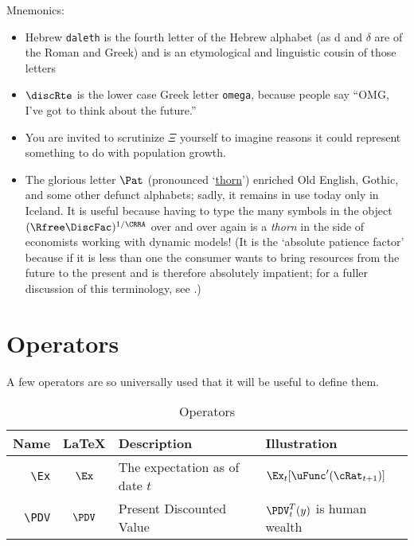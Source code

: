 \documentclass[12pt]{econtex}
\begin{document}
Mnemonics:
\begin{itemize}
\item Hebrew \texttt{daleth} is the fourth letter of the Hebrew alphabet (as d and $\delta$ are of the Roman and Greek) and is an etymological and linguistic cousin of those letters
\item $\discRte$ is the lower case Greek letter \texttt{omega}, because people say ``OMG, I've got to think about the future.''
\item You are invited to scrutinize $\Xi$ yourself to imagine reasons it could represent something to do with population growth.  
\item The glorious letter $\Pat$ (pronounced `\href{http://en.wikipedia.org/wiki/Thorn_(letter)}{thorn}') enriched Old English, Gothic, and some other defunct alphabets; sadly, it remains in use today only in Iceland.  It is useful because having to type the many symbols in the object $(\Rfree \DiscFac)^{1/\CRRA}$ over and over again is a \textit{thorn} in the side of economists working with dynamic models!  (It is the `absolute patience factor' because if it is less than one the consumer wants to bring resources from the future to the present and is therefore absolutely impatient; for a fuller discussion of this terminology, see \cite{carrollTractable}.)
\end{itemize}



\section{Operators}
A few operators are so universally used that it will be useful to define them.

\begin{table}[ht]
	\centering
	\begin{tabular}{|>{\ttfamily}rcll|} 		
		\hline
		 Name    & \LaTeX         & Description & Illustration
  \\ \hline
     \verb|\Ex|        & $\Ex$       & The expectation as of date $t$ & $\Ex_{t}[\uFunc^{\prime}(\cRat_{t+1})]$
\\   \verb|\PDV|        & $\PDV$       & Present Discounted Value & $\PDV_{t}^{T}(y)$ is human wealth
  \\	\hline
	\end{tabular}
	\caption{Operators}
	\label{table:Operators}
\end{table}	
\end{document}
